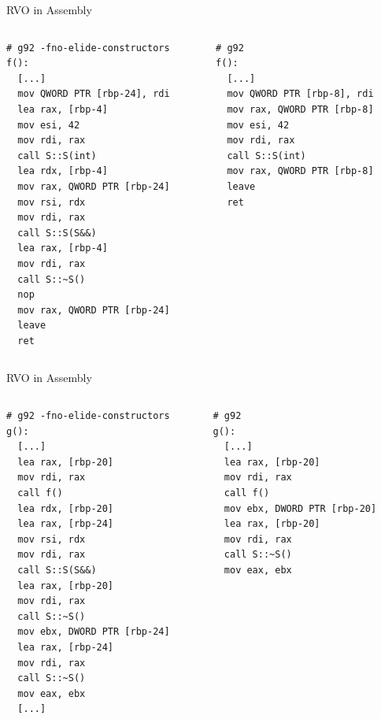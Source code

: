 \documentclass[compress,aspectratio=1610]{beamer}
\begin{document}
\begin{frame}[fragile]{RVO in Assembly}
    \begin{columns}[t]
        \begin{column}{.45\textwidth}
            \begin{lstlisting}[language={},morekeywords={rdi}]
# g92 -fno-elide-constructors
f():
  [...]
  mov QWORD PTR [rbp-24], rdi
  lea rax, [rbp-4]
  mov esi, 42
  mov rdi, rax
  call S::S(int)
  lea rdx, [rbp-4]
  mov rax, QWORD PTR [rbp-24]
  mov rsi, rdx
  mov rdi, rax
  call S::S(S&&)
  lea rax, [rbp-4]
  mov rdi, rax
  call S::~S()
  nop
  mov rax, QWORD PTR [rbp-24]
  leave
  ret
            \end{lstlisting}
        \end{column}
        \begin{column}{.45\textwidth}
            \begin{lstlisting}[language={},morekeywords={rdi}]
# g92
f():
  [...]
  mov QWORD PTR [rbp-8], rdi
  mov rax, QWORD PTR [rbp-8]
  mov esi, 42
  mov rdi, rax
  call S::S(int)
  mov rax, QWORD PTR [rbp-8]
  leave
  ret
            \end{lstlisting}
        \end{column}
    \end{columns}
\end{frame}

\begin{frame}[fragile]{RVO in Assembly}
    \begin{columns}[t]
        \begin{column}{.45\textwidth}
            \begin{lstlisting}[language={},morekeywords={rdi}]
# g92 -fno-elide-constructors
g():
  [...]
  lea rax, [rbp-20]
  mov rdi, rax
  call f()
  lea rdx, [rbp-20]
  lea rax, [rbp-24]
  mov rsi, rdx
  mov rdi, rax
  call S::S(S&&)
  lea rax, [rbp-20]
  mov rdi, rax
  call S::~S()
  mov ebx, DWORD PTR [rbp-24]
  lea rax, [rbp-24]
  mov rdi, rax
  call S::~S()
  mov eax, ebx
  [...]      
            \end{lstlisting}
        \end{column}
        \begin{column}{.45\textwidth}
            \begin{lstlisting}[language={},morekeywords={rdi}]
# g92
g():
  [...]
  lea rax, [rbp-20]
  mov rdi, rax
  call f()
  mov ebx, DWORD PTR [rbp-20]
  lea rax, [rbp-20]
  mov rdi, rax
  call S::~S()
  mov eax, ebx
            \end{lstlisting}
        \end{column}
    \end{columns}
\end{frame}
\end{document}

